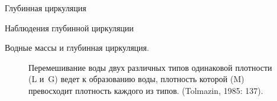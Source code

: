 \begin{chapter}{Глубинная циркуляция}
\begin{section}{Наблюдения глубинной циркуляции}
\begin{paragraph}{Водные массы и глубинная циркуляция.}
\begin{figure}[t!]
\begin{centering}
\end{centering}
\caption{Перемешивание воды двух различных типов
одинаковой плотности (L и~G) ведет к образованию воды, плотность 
которой (M) превосходит плотность каждого из типов. (Tolmazin, 1985: 137).}
\label{fig:densification}
\end{figure}
%
%
\end{paragraph}


\end{section}
\end{chapter}

